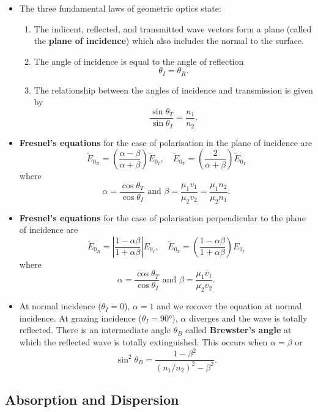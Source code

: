 \documentclass{article}
\begin{document}
\begin{itemize}
  \item The three fundamental laws of geometric optics state:

        \begin{enumerate}
          \item The indicent, reflected, and transmitted wave vectors form a plane (called the \textbf{plane of incidence}) which also includes the normal to the surface.

          \item The angle of incidence is equal to the angle of reflection \[\theta_I = \theta_R.\]

          \item The relationship between the angles of incidence and transmission is given by \[\frac{\sin \theta_T}{\sin \theta_I} = \frac{n_1}{n_2}.\]
        \end{enumerate}

  \item \textbf{Fresnel's equations} for the case of polarisation in the plane of incidence are \[\tilde{E}_{0_R} = \left( \frac{\alpha - \beta}{\alpha + \beta} \right) \tilde{E}_{0_I}, \quad \tilde{E}_{0_T} = \left( \frac{2}{\alpha + \beta} \right) \tilde{E}_{0_I}\] where \[\alpha = \frac{\cos \theta_T}{\cos \theta_I} \text{ and } \beta = \frac{\mu_1 v_1}{\mu_2 v_2} = \frac{\mu_1 n_2}{\mu_2 n_1}.\]

  \item \textbf{Fresnel's equations} for the case of polarisation perpendicular to the plane of incidence are \[\tilde{E}_{0_R} = \left| \frac{1 - \alpha \beta}{1 + \alpha \beta} \right| E_{0_I}, \quad \tilde{E}_{0_T} = \left( \frac{1 - \alpha \beta}{1 + \alpha \beta} \right) E_{0_I}\] where \[\alpha = \frac{\cos \theta_T}{\cos \theta_I} \text{ and } \beta = \frac{\mu_1 v_1}{\mu_2 v_2}.\]

  \item At normal incidence ($\theta_I = 0$), $\alpha = 1$ and we recover the equation at normal incidence. At grazing incidence ($\theta_I = \ang{90}$), $\alpha$ diverges and the wave is totally reflected. There is an intermediate angle $\theta_B$ called \textbf{Brewster's angle} at which the reflected wave is totally extinguished. This occurs when $\alpha = \beta$ or \[\sin^2 \theta_B = \frac{1 - \beta^2}{(n_1 / n_2)^2 - \beta^2}.\]
\end{itemize}

\subsection{Absorption and Dispersion}
\end{document}
